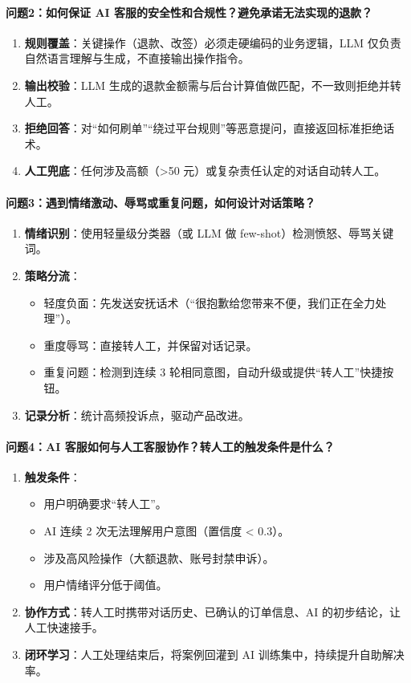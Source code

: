 \documentclass[12pt,a4paper]{article}
\begin{document}
\paragraph{问题2：如何保证 AI 客服的安全性和合规性？避免承诺无法实现的退款？}
\begin{enumerate}[label=(\arabic*)]
\item \textbf{规则覆盖}：关键操作（退款、改签）必须走硬编码的业务逻辑，LLM 仅负责自然语言理解与生成，不直接输出操作指令。
\item \textbf{输出校验}：LLM 生成的退款金额需与后台计算值做匹配，不一致则拒绝并转人工。
\item \textbf{拒绝回答}：对“如何刷单”“绕过平台规则”等恶意提问，直接返回标准拒绝话术。
\item \textbf{人工兜底}：任何涉及高额（>50 元）或复杂责任认定的对话自动转人工。
\end{enumerate}

\paragraph{问题3：遇到情绪激动、辱骂或重复问题，如何设计对话策略？}
\begin{enumerate}[label=(\arabic*)]
\item \textbf{情绪识别}：使用轻量级分类器（或 LLM 做 few-shot）检测愤怒、辱骂关键词。
\item \textbf{策略分流}：
\begin{itemize}
  \item 轻度负面：先发送安抚话术（“很抱歉给您带来不便，我们正在全力处理”）。
  \item 重度辱骂：直接转人工，并保留对话记录。
  \item 重复问题：检测到连续 3 轮相同意图，自动升级或提供“转人工”快捷按钮。
\end{itemize}
\item \textbf{记录分析}：统计高频投诉点，驱动产品改进。
\end{enumerate}

\paragraph{问题4：AI 客服如何与人工客服协作？转人工的触发条件是什么？}
\begin{enumerate}[label=(\arabic*)]
\item \textbf{触发条件}：
\begin{itemize}
  \item 用户明确要求“转人工”。
  \item AI 连续 2 次无法理解用户意图（置信度 < 0.3）。
  \item 涉及高风险操作（大额退款、账号封禁申诉）。
  \item 用户情绪评分低于阈值。
\end{itemize}
\item \textbf{协作方式}：转人工时携带对话历史、已确认的订单信息、AI 的初步结论，让人工快速接手。
\item \textbf{闭环学习}：人工处理结束后，将案例回灌到 AI 训练集中，持续提升自助解决率。
\end{enumerate}
\end{document}
